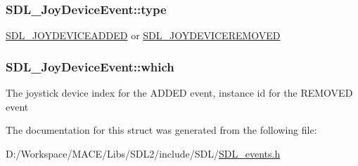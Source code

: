 \subsubsection[{\texorpdfstring{type}{type}}]{ S\+D\+L\+\_\+\+Joy\+Device\+Event\+::type}\hypertarget{struct_s_d_l___joy_device_event_a51f060ba1dd5669b458e9c97aece667e}{}\label{struct_s_d_l___joy_device_event_a51f060ba1dd5669b458e9c97aece667e}
\hyperlink{_s_d_l__events_8h_a3b589e89be6b35c02e0dd34a55f3fccaa0500c4e830a1822e6d0a90294c3f1393}{S\+D\+L\+\_\+\+J\+O\+Y\+D\+E\+V\+I\+C\+E\+A\+D\+D\+ED} or \hyperlink{_s_d_l__events_8h_a3b589e89be6b35c02e0dd34a55f3fccaa4e2d7a1067dc56abeee393d46309ecd0}{S\+D\+L\+\_\+\+J\+O\+Y\+D\+E\+V\+I\+C\+E\+R\+E\+M\+O\+V\+ED} 
\subsubsection[{\texorpdfstring{which}{which}}]{ S\+D\+L\+\_\+\+Joy\+Device\+Event\+::which}\hypertarget{struct_s_d_l___joy_device_event_af9b295798f033b799ebbda7de6cb5a7e}{}\label{struct_s_d_l___joy_device_event_af9b295798f033b799ebbda7de6cb5a7e}
The joystick device index for the A\+D\+D\+ED event, instance id for the R\+E\+M\+O\+V\+ED event 

The documentation for this struct was generated from the following file\+:\begin{DoxyCompactItemize}
\item 
D\+:/\+Workspace/\+M\+A\+C\+E/\+Libs/\+S\+D\+L2/include/\+S\+D\+L/\hyperlink{_s_d_l__events_8h}{S\+D\+L\+\_\+events.\+h}\end{DoxyCompactItemize}
